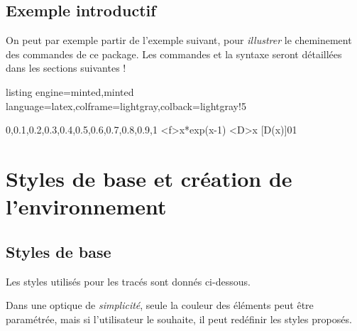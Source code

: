 \documentclass[11pt,a4paper]{ltxdoc}
\begin{document}
\pagebreak

\subsection{Exemple introductif}

On peut par exemple partir de l'exemple suivant, pour \textit{illustrer} le cheminement des commandes de ce package. Les commandes et la syntaxe seront détaillées dans les sections suivantes !

\begin{tcblisting}{listing engine=minted,minted language=latex,colframe=lightgray,colback=lightgray!5}
\begin{GraphiqueTikz}%
  [x=10cm,y=10cm,Xmin=0,Xmax=1.001,Xgrille=0.1,Xgrilles=0.02,
  Ymin=0,Ymax=1.001,Ygrille=0.1,Ygrilles=0.02]
    {0,0.1,0.2,0.3,0.4,0.5,0.6,0.7,0.8,0.9,1}
  \DefinirCourbe[Nom=cf,Debut=0,Fin=1]<f>{x*exp(x-1)}
  \DefinirCourbe[Nom=delta,Debut=0,Fin=1]<D>{x}
  [D(x)]{0}{1}
\end{GraphiqueTikz}
\end{tcblisting}

\newpage

\section{Styles de base et création de l'environnement}

\subsection{Styles de base}

Les styles utilisés pour les tracés sont donnés ci-dessous.

\smallskip

Dans une optique de \textit{simplicité}, seule la couleur des éléments peut être paramétrée, mais si l'utilisateur le souhaite, il peut redéfinir les styles proposés.
\end{document}
